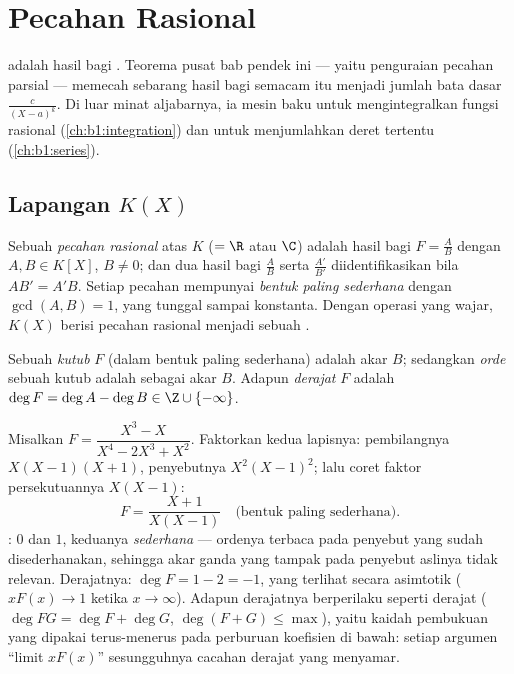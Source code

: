 \chapter{Pecahan Rasional}\label{ch:b1:fractions}

 adalah hasil bagi . Teorema pusat
bab pendek ini --- yaitu penguraian pecahan
parsial --- memecah sebarang
hasil bagi semacam itu menjadi jumlah bata dasar $\frac{c}{(X - a)^k}$.
Di luar minat aljabarnya, ia mesin baku untuk
mengintegralkan fungsi rasional (\cref{ch:b1:integration}) dan untuk
menjumlahkan deret tertentu (\cref{ch:b1:series}).

\section{Lapangan $K(X)$}

\begin{definition}\label{def:b1:fractions:field}
Sebuah \emph{pecahan rasional} atas $K$ ($= \R$
atau $\C$) adalah hasil bagi $F = \frac{A}{B}$ dengan $A, B \in K[X]$, $B \neq
0$; dan dua hasil bagi $\frac AB$ serta $\frac{A'}{B'}$ diidentifikasikan bila
$AB' = A'B$. Setiap pecahan mempunyai \emph{bentuk paling sederhana} dengan
$\gcd(A, B) = 1$, yang tunggal sampai konstanta. Dengan operasi yang wajar,
 $K(X)$ berisi pecahan rasional menjadi sebuah .

Sebuah \emph{kutub} $F$ (dalam bentuk paling sederhana) adalah akar
$B$; sedangkan \emph{orde} sebuah kutub adalah  sebagai akar $B$.
Adapun \emph{derajat} $F$ adalah $\deg F = \deg A - \deg B \in \Z \cup
\{-\infty\}$.
\end{definition}

\begin{example}\label{ex:b1:fractions:vocab}
Misalkan $F = \dfrac{X^3 - X}{X^4 - 2X^3 + X^2}$. Faktorkan kedua lapisnya:
pembilangnya $X(X-1)(X+1)$, penyebutnya $X^2(X-1)^2$; lalu coret
faktor persekutuannya $X(X-1)$:
\[
F = \frac{X + 1}{X(X - 1)} \quad\text{(bentuk paling sederhana).}
\]
: $0$ dan $1$, keduanya \emph{sederhana} --- ordenya terbaca pada
penyebut yang sudah disederhanakan, sehingga akar ganda yang tampak pada penyebut
aslinya tidak relevan. Derajatnya: $\deg F = 1 - 2 = -1$,
yang terlihat secara asimtotik ($xF(x) \to 1$ ketika $x \to \infty$). Adapun
derajatnya berperilaku seperti derajat  ($\deg FG = \deg F +
\deg G$, $\deg(F + G) \leq \max$), yaitu kaidah pembukuan yang dipakai
terus-menerus pada perburuan koefisien di bawah: setiap argumen ``limit
$xF(x)$'' sesungguhnya cacahan derajat yang menyamar.
\end{example}

